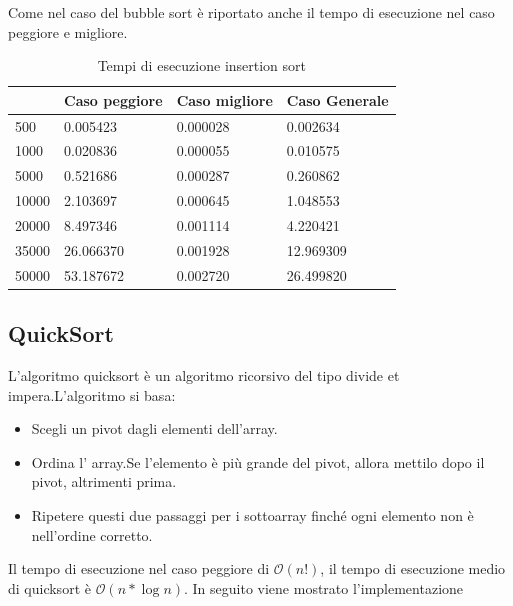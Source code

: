 \documentclass[12pt,a4paper]{report}
\begin{document}
	

Come nel caso del bubble sort è riportato anche il tempo di esecuzione nel caso peggiore e migliore.

\begin{table}[h]
\centering
\begin{tabular}{| l | l | l | l |}
\hline
           & Caso peggiore & Caso migliore & Caso Generale \\ \hline
500   & 0.005423      & 0.000028      & 0.002634      \\ \hline
1000  & 0.020836	    & 0.000055      & 0.010575      \\ \hline
5000  & 0.521686      & 0.000287     & 0.260862     \\ \hline
10000 & 2.103697      & 0.000645     & 1.048553      \\ \hline
20000 & 8.497346     & 0.001114      & 4.220421     \\ \hline
35000 & 26.066370     & 0.001928     & 12.969309     \\ \hline
50000 & 53.187672     & 0.002720   & 26.499820    \\ \hline

\end{tabular}
\caption{Tempi di esecuzione insertion sort}
\label{Tab:Tempi esecuzione InsertionSort}
\end{table}


\subsection{QuickSort}
L'algoritmo quicksort è un algoritmo ricorsivo del tipo divide et impera.L'algoritmo si basa:
\begin{itemize}
\item Scegli un pivot dagli elementi dell'array.
\item Ordina l' array.Se l'elemento è più grande del pivot, allora mettilo  dopo il pivot, altrimenti prima.
\item Ripetere questi due passaggi per i sottoarray finché ogni elemento non è nell'ordine corretto.
\end{itemize}

Il tempo di esecuzione nel caso peggiore di $\mathcal{O}(n!) $, il tempo di esecuzione medio di quicksort è $\mathcal{O}(n * \log{}n) $. In seguito viene mostrato l'implementazione 
\end{document}
